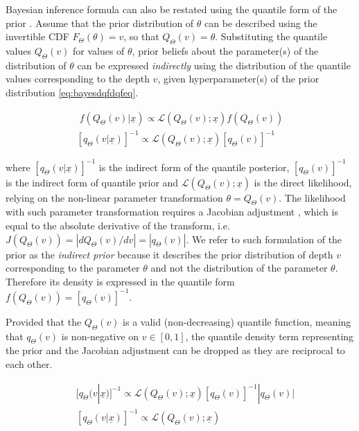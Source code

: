 \documentclass[
  12pt,
]{article}
\begin{document}
Bayesian inference formula can also be restated using the quantile form of the prior \citep{nair2020BayesianInferenceQuantile}. Assume that the prior distribution of \(\theta\) can be described using the invertible CDF \(F_\Theta(\theta)=v\), so that \(Q_\Theta(v)=\theta\). Substituting the quantile values \(Q_\Theta(v)\) for values of \(\theta\), prior beliefs about the parameter(s) of the distribution of \(\theta\) can be expressed \emph{indirectly} using the distribution of the quantile values corresponding to the depth \(v\), given hyperparameter(s) of the prior distribution \eqref{eq:bayesdqfdqfeq}.

\[
\begin{gathered}\;
f(Q_\Theta(v)|\underline{x}) \propto \mathcal{L}(Q_\Theta(v);\underline{x})f(Q_\Theta(v)) \\
[q_\Theta(v|\underline{x})]^{-1} \propto \mathcal{L}(Q_\Theta(v);\underline{x})[q_\Theta(v)]^{-1}
\end{gathered}
\label{eq:bayesdqfdqfeq}
\]

where \([q_\Theta(v|\underline{x})]^{-1}\) is the indirect form of the quantile posterior, \([q_\Theta(v)]^{-1}\) is the indirect form of quantile prior and \(\mathcal{L}(Q_\Theta(v);\underline{x})\) is the direct likelihood, relying on the non-linear parameter transformation \(\theta=Q_\Theta(v)\). The likelihood with such parameter transformation requires a Jacobian adjustment \citep{andrilli2010ElementaryLinearAlgebra}, which is equal to the absolute derivative of the transform, i.e.~\(J(Q_\Theta(v))=|dQ_\Theta(v)/dv|=|q_\Theta(v)|\). We refer to such formulation of the prior as the \emph{indirect prior} because it describes the prior distribution of depth \(v\) corresponding to the parameter \(\theta\) and not the distribution of the parameter \(\theta\). Therefore its density is expressed in the quantile form \(f(Q_\Theta(v))=[q_\Theta(v)]^{-1}\).

Provided that the \(Q_\Theta(v)\) is a valid (non-decreasing) quantile function, meaning that \(q_\Theta(v)\) is non-negative on \(v \in [0,1]\), the quantile density term representing the prior and the Jacobian adjustment can be dropped as they are reciprocal to each other.

\[ 
\begin{aligned}\;
&[q_\Theta(v|\underline{x})]^{-1} \propto \mathcal{L}(Q_\Theta(v);\underline{x})[q_\Theta(v)]^{-1}|q_\Theta(v)| \\
&[q_\Theta(v|\underline{x})]^{-1} \propto \mathcal{L}(Q_\Theta(v);\underline{x})
\end{aligned}
\label{eq:bayesidqfeq}
\]
\end{document}
